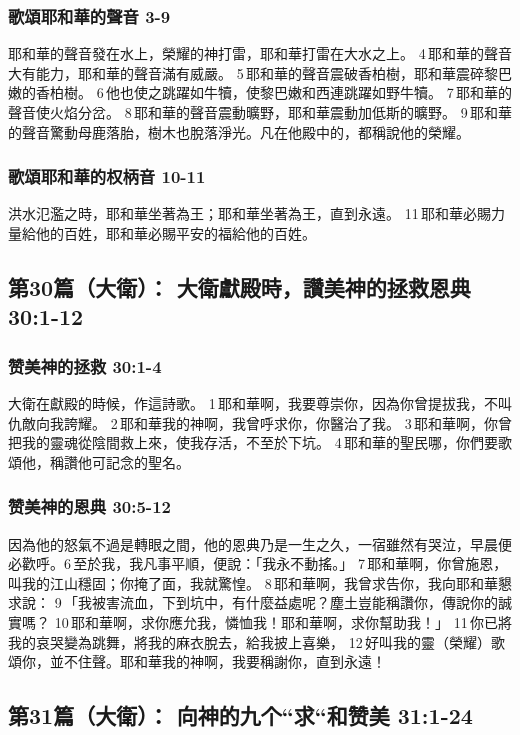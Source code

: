 \subsubsection{歌頌耶和華的聲音 3-9}
耶和華的聲音發在水上，榮耀的神打雷，耶和華打雷在大水之上。
4 耶和華的聲音大有能力，耶和華的聲音滿有威嚴。
5 耶和華的聲音震破香柏樹，耶和華震碎黎巴嫩的香柏樹。
6 他也使之跳躍如牛犢，使黎巴嫩和西連跳躍如野牛犢。
7 耶和華的聲音使火焰分岔。
8 耶和華的聲音震動曠野，耶和華震動加低斯的曠野。
9 耶和華的聲音驚動母鹿落胎，樹木也脫落淨光。凡在他殿中的，都稱說他的榮耀。
\subsubsection{歌頌耶和華的权柄音 10-11}
洪水氾濫之時，耶和華坐著為王；耶和華坐著為王，直到永遠。
11 耶和華必賜力量給他的百姓，耶和華必賜平安的福給他的百姓。


\subsection{第30篇（大衛）： 大衛獻殿時，讚美神的拯救恩典 30:1-12}
\subsubsection{赞美神的拯救 30:1-4}
大衛在獻殿的時候，作這詩歌。
1 耶和華啊，我要尊崇你，因為你曾提拔我，不叫仇敵向我誇耀。
2 耶和華我的神啊，我曾呼求你，你醫治了我。
3 耶和華啊，你曾把我的靈魂從陰間救上來，使我存活，不至於下坑。
4 耶和華的聖民哪，你們要歌頌他，稱讚他可記念的聖名。
\subsubsection{赞美神的恩典 30:5-12}
因為他的怒氣不過是轉眼之間，他的恩典乃是一生之久，一宿雖然有哭泣，早晨便必歡呼。6 至於我，我凡事平順，便說：「我永不動搖。」
7 耶和華啊，你曾施恩，叫我的江山穩固；你掩了面，我就驚惶。
8 耶和華啊，我曾求告你，我向耶和華懇求說：
9 「我被害流血，下到坑中，有什麼益處呢？塵土豈能稱讚你，傳說你的誠實嗎？
10 耶和華啊，求你應允我，憐恤我！耶和華啊，求你幫助我！」
11 你已將我的哀哭變為跳舞，將我的麻衣脫去，給我披上喜樂，
12 好叫我的靈（榮耀）歌頌你，並不住聲。耶和華我的神啊，我要稱謝你，直到永遠！


\subsection{第31篇（大衛）： 向神的九个“求“和赞美 31:1-24}
